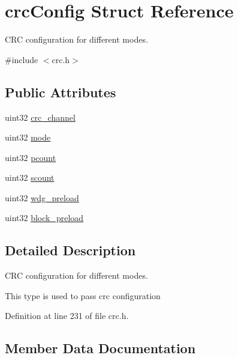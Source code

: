 \hypertarget{structcrcConfig}{}\section{crc\+Config Struct Reference}
\label{structcrcConfig}


C\+RC configuration for different modes.  




{\ttfamily \#include $<$crc.\+h$>$}

\subsection*{Public Attributes}
\begin{DoxyCompactItemize}
\item 
uint32 \mbox{\hyperlink{structcrcConfig_ab54bed0d40319fb79732059b240faad1}{crc\+\_\+channel}}
\item 
uint32 \mbox{\hyperlink{structcrcConfig_ad3578b2d11eb0ffa1a0d4dd75e7e9465}{mode}}
\item 
uint32 \mbox{\hyperlink{structcrcConfig_a8c90bbdcf8ea8a062273e62ea40fce36}{pcount}}
\item 
uint32 \mbox{\hyperlink{structcrcConfig_abfc8935e33601a14f96ab83618b93482}{scount}}
\item 
uint32 \mbox{\hyperlink{structcrcConfig_aec5b9938f600e872530c77b6746df64d}{wdg\+\_\+preload}}
\item 
uint32 \mbox{\hyperlink{structcrcConfig_a0de477a32b033b3767ef0603058da6ce}{block\+\_\+preload}}
\end{DoxyCompactItemize}


\subsection{Detailed Description}
C\+RC configuration for different modes. 

This type is used to pass crc configuration 

Definition at line 231 of file crc.\+h.



\subsection{Member Data Documentation}
\mbox{\label{structcrcConfig_a0de477a32b033b3767ef0603058da6ce}} 

